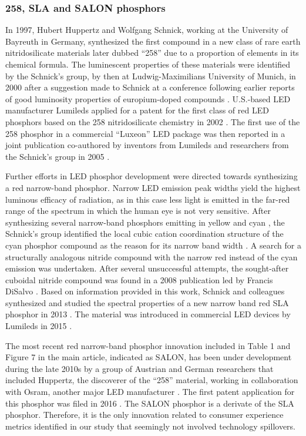 \documentclass[10pt]{article}
\begin{document}
\subsubsection{258, SLA and SALON phosphors}

In 1997, Hubert Huppertz and Wolfgang Schnick, working at the University of Bayreuth in Germany, synthesized the first compound in a new class of rare earth nitridosilicate materials \cite{Huppertz1997} later dubbed “258” due to a proportion of elements in its chemical formula. The luminescent properties of these materials were identified by the Schnick’s group, by then at Ludwig-Maximilians University of Munich, in 2000 \cite{Hppe2000} after a suggestion made to Schnick at a conference following earlier reports of good luminosity properties of europium-doped compounds \cite{Qiua1998}. U.S.-based LED manufacturer Lumileds applied for a patent for the first class of red LED phosphors based on the 258 nitridosilicate chemistry in 2002 \cite{mueller2004phosphor}. The first use of the 258 phosphor in a commercial “Luxeon” LED package was then reported in a joint publication co-authored by inventors from Lumileds and researchers from the Schnick’s group in 2005 \cite{MuellerMach2005}.

Further efforts in LED phosphor development were directed towards synthesizing a red narrow-band phosphor. Narrow LED emission peak widths yield the highest luminous efficacy of radiation, as in this case less light is emitted in the far-red range of the spectrum in which the human eye is not very sensitive. After synthesizing several narrow-band phosphors emitting in yellow \cite{Hppe2004} and cyan \cite{Kechele2009}, the Schnick’s group identified the local cubic cation coordination structure of the cyan phosphor compound as the reason for its narrow band width \cite{lumi2016narrow}. A search for a structurally analogous nitride compound with the narrow red instead of the cyan emission was undertaken. After several unsuccessful attempts, the sought-after cuboidal nitride compound was found in a 2008 publication led by Francis DiSalvo \cite{Park2008Sr}. Based on information provided in this work, Schnick and colleagues synthesized and studied the spectral properties of a new narrow band red SLA phosphor in 2013 \cite{schmidt2013new}\cite{Pust2014}\cite{schmidt2017phosphors}. The material was introduced in commercial LED devices by Lumileds in 2015 \cite{lumi2016narrow_whitepaper}. 

The most recent red narrow-band phosphor innovation included in Table 1 and Figure 7 in the main article, indicated as SALON, has been under development during the late 2010s by a group of Austrian and German researchers that included Huppertz, the discoverer of the “258” material, working in collaboration with Osram, another major LED manufacturer \cite{seibald2019phosphor}\cite{Hoerder2019}\cite{Hoerder2020}. The first patent application for this phosphor was filed in 2016 . The SALON phosphor is a derivate of the SLA phosphor. Therefore, it is the only innovation related to consumer experience metrics identified in our study that seemingly not involved technology spillovers.
\end{document}

